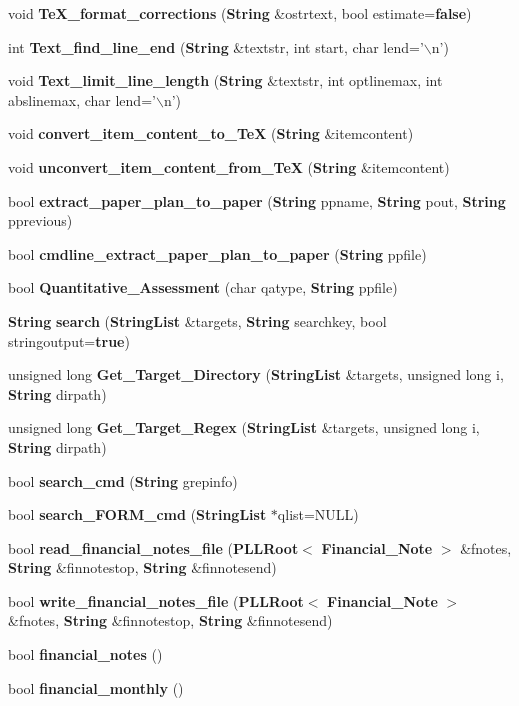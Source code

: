 \begin{CompactItemize}
\item 
void {\bf Te\-X\_\-format\_\-corrections} ({\bf String} \&ostrtext, bool estimate={\bf false})
\item 
int {\bf Text\_\-find\_\-line\_\-end} ({\bf String} \&textstr, int start, char lend='$\backslash$n')
\item 
void {\bf Text\_\-limit\_\-line\_\-length} ({\bf String} \&textstr, int optlinemax, int abslinemax, char lend='$\backslash$n')
\item 
void {\bf convert\_\-item\_\-content\_\-to\_\-Te\-X} ({\bf String} \&itemcontent)
\item 
void {\bf unconvert\_\-item\_\-content\_\-from\_\-Te\-X} ({\bf String} \&itemcontent)
\item 
bool {\bf extract\_\-paper\_\-plan\_\-to\_\-paper} ({\bf String} ppname, {\bf String} pout, {\bf String} pprevious)
\item 
bool {\bf cmdline\_\-extract\_\-paper\_\-plan\_\-to\_\-paper} ({\bf String} ppfile)
\item 
bool {\bf Quantitative\_\-Assessment} (char qatype, {\bf String} ppfile)
\item 
{\bf String} {\bf search} ({\bf String\-List} \&targets, {\bf String} searchkey, bool stringoutput={\bf true})
\item 
unsigned long {\bf Get\_\-Target\_\-Directory} ({\bf String\-List} \&targets, unsigned long i, {\bf String} dirpath)
\item 
unsigned long {\bf Get\_\-Target\_\-Regex} ({\bf String\-List} \&targets, unsigned long i, {\bf String} dirpath)
\item 
bool {\bf search\_\-cmd} ({\bf String} grepinfo)
\item 
bool {\bf search\_\-FORM\_\-cmd} ({\bf String\-List} $\ast$qlist=NULL)
\item 
bool {\bf read\_\-financial\_\-notes\_\-file} ({\bf PLLRoot}$<$ {\bf Financial\_\-Note} $>$ \&fnotes, {\bf String} \&finnotestop, {\bf String} \&finnotesend)
\item 
bool {\bf write\_\-financial\_\-notes\_\-file} ({\bf PLLRoot}$<$ {\bf Financial\_\-Note} $>$ \&fnotes, {\bf String} \&finnotestop, {\bf String} \&finnotesend)
\item 
bool {\bf financial\_\-notes} ()
\item 
bool {\bf financial\_\-monthly} ()
\end{CompactItemize}
